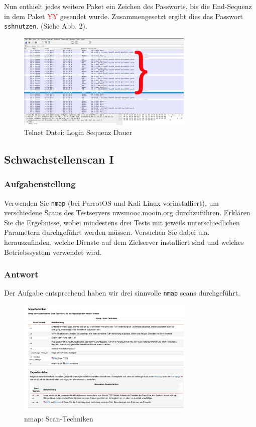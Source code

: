 \documentclass{article}
\begin{document}
Nun enthielt jedes weitere Paket ein Zeichen des Passworts, bis die End-Sequenz
in dem Paket \textcolor{red}{YY} gesendet wurde. Zusammengesetzt ergibt dies das 
Passwort \texttt{sshnutzen}. (Siehe Abb. 2).

\begin{figure}[H]
	\includegraphics[width=0.75\textwidth]{images/02}
	\centering
	\caption{Telnet Datei: Login Sequenz Dauer}
\end{figure}

\newpage

\subsection{Schwachstellenscan I}

\subsubsection*{Aufgabenstellung}

Verwenden Sie \texttt{nmap} (bei ParrotOS und Kali Linux vorinstalliert), um verschiedene 
Scans des Testservers nwsmooc.mooin.org durchzuführen. Erklären Sie die Ergebnisse, wobei 
mindestens drei Tests mit jeweils unterschiedlichen Parametern durchgeführt werden müssen. 
Versuchen Sie dabei u.a. herauszufinden, welche Dienste auf dem Zielserver installiert
sind und welches Betriebssystem verwendet wird.

\subsubsection*{Antwort}

Der Aufgabe entsprechend haben wir drei sinnvolle \texttt{nmap} scans durchgeführt. 

\begin{figure}[H]
	\includegraphics[width=0.75\textwidth]{images/03}
	\centering
	\caption{nmap: Scan-Techniken}
\end{figure}
\end{document}
